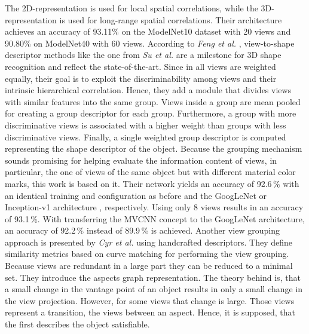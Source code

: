The 2D-representation is used for local spatial correlations, while the 3D-representation is used for long-range spatial correlations.
Their architecture achieves an accuracy of 93.11\% on the ModelNet10 dataset with 20 views and 90.80\% on ModelNet40 with 60 views.
According to \textit{Feng et al.} \cite{Feng2018}, view-to-shape descriptor methods like the one from \textit{Su et al.} are a milestone for 3D shape recognition and reflect the state-of-the-art.
Since in \cite{Su:2015:MCN:2919332.2919750} all views are weighted equally, their goal is to exploit the discriminability among views and their intrinsic hierarchical correlation.
Hence, they add a module that divides views with similar features into the same group.
Views inside a group are mean pooled for creating a group descriptor for each group.
Furthermore, a group with more discriminative views is associated with a higher weight than groups with less discriminative views.
Finally, a single weighted group descriptor is computed representing the shape descriptor of the object.
Because the grouping mechanism sounds promising for helping evaluate the information content of views, in particular, the one of views of the same object but with different material color marks, this work is based on it.
Their network yields an accuracy of 92.6\,\% with an identical training and configuration as before and the GoogLeNet or Inception-v1 architecture \cite{szegedy2015}, respectively.
Using only 8 views results in an accuracy of 93.1\,\%.
With transferring the MVCNN concept to the GoogLeNet architecture, an accuracy of 92.2\,\% instead of 89.9\,\% is achieved.
Another view grouping approach is presented by \textit{Cyr et al.} \cite{Cyr2004} using handcrafted descriptors.
They define similarity metrics based on curve matching for performing the view grouping.
Because views are redundant in a large part they can be reduced to a minimal set.
They introduce the aspects graph representation.
The theory behind is, that a small change in the vantage point of an object results in only a small change in the view projection.
However, for some views that change is large.
Those views represent a transition, the views between an aspect.
Hence, it is supposed, that the first describes the object satisfiable.